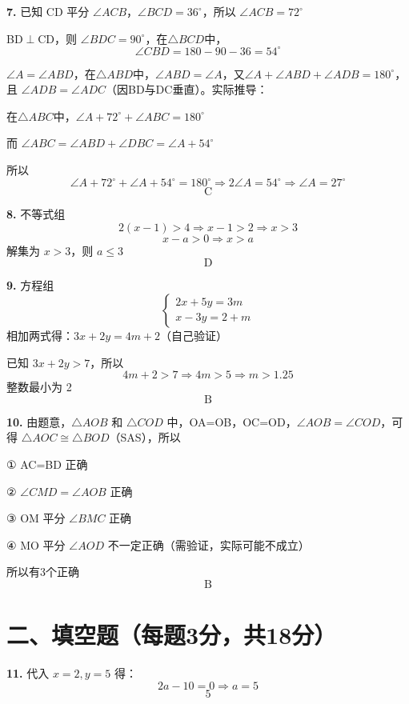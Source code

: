 \bigskip

\textbf{7.} 已知 CD 平分 \(\angle ACB\)，\(\angle BCD = 36^\circ\)，所以 \(\angle ACB = 72^\circ\)

BD\(\perp\)CD，则 \(\angle BDC = 90^\circ\)，在\(\triangle BCD\)中，
\[
\angle CBD = 180-90-36=54^\circ
\]

\(\angle A = \angle ABD\)，在\(\triangle ABD\)中，\(\angle ABD = \angle A\)，又\(\angle A + \angle ABD + \angle ADB = 180^\circ\)，且 \(\angle ADB = \angle ADC\)（因BD与DC垂直）。实际推导：

在\(\triangle ABC\)中，\(\angle A + 72^\circ + \angle ABC = 180^\circ\)

而 \(\angle ABC = \angle ABD + \angle DBC = \angle A + 54^\circ\)

所以
\[
\angle A + 72^\circ + \angle A + 54^\circ = 180^\circ \Rightarrow 2\angle A = 54^\circ \Rightarrow \angle A = 27^\circ
\]
\[
\boxed{\text{C}}
\]

\bigskip

\textbf{8.} 不等式组
\[
2(x-1)>4 \Rightarrow x-1>2 \Rightarrow x>3
\]
\[
x-a>0 \Rightarrow x>a
\]
解集为 \(x>3\)，则 \(a \le 3\)
\[
\boxed{\text{D}}
\]

\bigskip

\textbf{9.} 方程组
\[
\begin{cases}
2x+5y=3m \\
x-3y=2+m
\end{cases}
\]
相加两式得：\(3x+2y = 4m+2\)（自己验证）

已知 \(3x+2y > 7\)，所以
\[
4m+2 > 7 \Rightarrow 4m > 5 \Rightarrow m > 1.25
\]
整数最小为 2
\[
\boxed{\text{B}}
\]

\bigskip

\textbf{10.} 由题意，\(\triangle AOB\) 和 \(\triangle COD\) 中，OA=OB，OC=OD，\(\angle AOB=\angle COD\)，可得 \(\triangle AOC \cong \triangle BOD\)（SAS），所以

① AC=BD 正确

② \(\angle CMD = \angle AOB\) 正确

③ OM 平分 \(\angle BMC\) 正确

④ MO 平分 \(\angle AOD\) 不一定正确（需验证，实际可能不成立）

所以有3个正确
\[
\boxed{\text{B}}
\]

\section*{二、填空题（每题3分，共18分）}

\textbf{11.} 代入 \(x=2, y=5\) 得：
\[
2a - 10 = 0 \Rightarrow a = 5
\]
\[
\boxed{5}
\]


